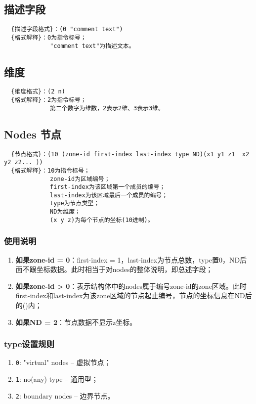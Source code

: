 \documentclass[lang=cn,11pt,a4paper]{elegantpaper}
\begin{document}
\subsection{描述字段}\label{Comment}
\begin{lstlisting}
  {描述字段格式}：(0 "comment text")
  {格式解释}：0为指令标号；
             "comment text"为描述文本。
\end{lstlisting}

\subsection{维度}\label{Dimensions}
\begin{lstlisting}
  {维度格式}：(2 n)
  {格式解释}：2为指令标号；
             第二个数字为维数，2表示2维、3表示3维。 
\end{lstlisting}

\subsection{Nodes 节点}\label{Nodes}
\begin{lstlisting}
  {节点格式}：(10 (zone-id first-index last-index type ND)(x1 y1 z1  x2 y2 z2... ))
  {格式解释}：10为指令标号；
             zone-id为区域编号；
             first-index为该区域第一个成员的编号；
             last-index为该区域最后一个成员的编号；
             type为节点类型；
             ND为维度；
             (x y z)为每个节点的坐标(10进制)。
\end{lstlisting}

\subsubsection{使用说明}
\begin{enumerate}
  \item \textbf{如果zone-id = 0}：first-index = 1，last-index为节点总数，type置0，ND后面不跟坐标数据。此时相当于对nodes的整体说明，即总述字段；
  \item \textbf{如果zone-id > 0}：表示结构体中的nodes属于编号zone-id的zone区域。此时first-index和last-index为该zone区域的节点起止编号，节点的坐标信息在ND后的()内；
  \item \textbf{如果ND = 2}：节点数据不显示z坐标。
\end{enumerate}

\subsubsection{type设置规则}\label{node-type}
\begin{enumerate}[label=\arabic*).]
  \item \lstinline{0}: "virtual" nodes -- 虚拟节点；
  \item \lstinline{1}: no(any) type -- 通用型；
  \item \lstinline{2}: boundary nodes -- 边界节点。
\end{enumerate}
\end{document}
